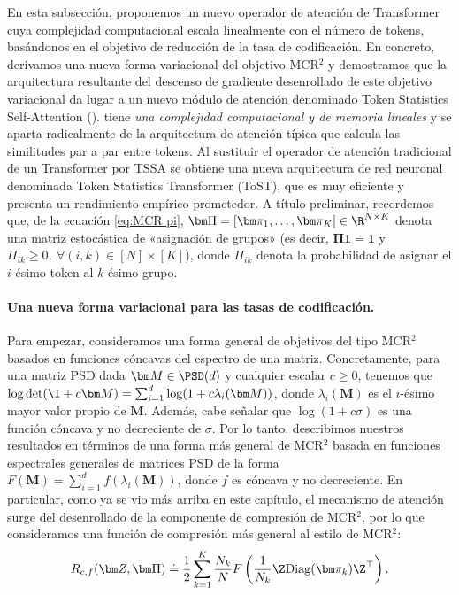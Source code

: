 \documentclass[../../book-main.tex]{subfiles}
\begin{document}
En esta subsección, proponemos un nuevo operador de atención de Transformer
cuya complejidad computacional escala linealmente con el número de
tokens, basándonos en el objetivo de reducción de la tasa de codificación.  En concreto,
derivamos una nueva forma variacional del objetivo MCR$^2$ y demostramos
que la arquitectura resultante del descenso de gradiente desenrollado de
este objetivo variacional da lugar a un nuevo módulo de atención denominado
Token Statistics Self-Attention ().  tiene
{\em una complejidad computacional y de memoria lineales} y se aparta radicalmente
de la arquitectura de atención típica que calcula
las similitudes par a par entre tokens.  Al sustituir el operador de atención tradicional
de un Transformer por TSSA se obtiene una nueva arquitectura de red neuronal
denominada Token Statistics Transformer (ToST),
que es muy eficiente y presenta un rendimiento empírico prometedor. A título
preliminar, recordemos que, de la ecuación \eqref{eq:MCR pi}, $\bm \Pi = [\bm
\pi_1, \ldots, \bm \pi_K] \in \R^{N \times K}$ denota una matriz estocástica
de «asignación de grupos» (es decir, $\bm \Pi \bm 1 = \bm 1$ y
$\Pi_{ik} \geq 0, \  \forall (i,k) \in [N] \times [K]$), donde
$\Pi_{ik}$ denota la probabilidad de asignar el $i$-ésimo token al
$k$-ésimo grupo.

\paragraph{Una nueva forma variacional para las tasas de codificación.} Para empezar,
consideramos una forma general de objetivos del tipo MCR$^2$ basados en funciones cóncavas
del espectro de una matriz.  Concretamente, para una matriz PSD
dada $\bm M \in \PSD(d)$ y cualquier escalar $c \geq 0$, tenemos que
$\log \det (\I + c \bm M) = \sum_{i=1}^{d} \log( 1 + c \lambda_i(\bm
M))$, donde $\lambda_i (\bm M)$ es el $i$-ésimo mayor valor propio de
$\bm M$. Además, cabe señalar que $\log(1 + c \sigma)$ es una función cóncava
y no decreciente de $\sigma$. Por lo tanto, describimos nuestros resultados
en términos de una forma más general de MCR$^2$ basada en funciones espectrales generales
de matrices PSD de la forma $F(\bm M) = \sum_{i=1}^{d}
f(\lambda_i(\bm M))$, donde $f$ es cóncava y no decreciente.  En
particular, como ya se vio más arriba en este capítulo, el mecanismo de atención
surge del desenrollado de la componente de compresión de MCR$^2$,
por lo que consideramos una función de compresión más general al estilo de MCR$^2$:
\begin{equation}
    R_{c,f}(\bm Z, \bm \Pi) \doteq \frac{1}{2}\sum_{k=1}^K
    \frac{N_k}{N} F\left( \frac{1}{N_k}\Z \mathrm{Diag}(\bm \pi_k)
    \Z^{\top} \right).
    \label{eq:mcr_c_gen}
\end{equation}
\end{document}
